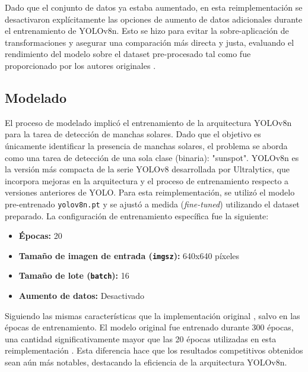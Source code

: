 \documentclass[journal]{IEEEtran}
\begin{document}
Dado que el conjunto de datos ya estaba aumentado, en esta reimplementación se desactivaron explícitamente las opciones de aumento de datos adicionales durante el entrenamiento de YOLOv8n. Esto se hizo para evitar la sobre-aplicación de transformaciones y asegurar una comparación más directa y justa, evaluando el rendimiento del modelo sobre el dataset pre-procesado tal como fue proporcionado por los autores originales \cite{Santos2023}.
\subsection{Modelado}
El proceso de modelado implicó el entrenamiento de la arquitectura YOLOv8n para la tarea de detección de manchas solares. Dado que el objetivo es únicamente identificar la presencia de manchas solares, el problema se aborda como una tarea de detección de una sola clase (binaria): "sunspot". YOLOv8n es la versión más compacta de la serie YOLOv8 desarrollada por Ultralytics, que incorpora mejoras en la arquitectura y el proceso de entrenamiento respecto a versiones anteriores de YOLO. Para esta reimplementación, se utilizó el modelo pre-entrenado \texttt{yolov8n.pt} y se ajustó a medida (\textit{fine-tuned}) utilizando el dataset preparado. La configuración de entrenamiento específica fue la siguiente:
\begin{itemize}
    \item \textbf{Épocas:} 20
    \item \textbf{Tamaño de imagen de entrada (\texttt{imgsz}):} 640x640 píxeles
    \item \textbf{Tamaño de lote (\texttt{batch}):} 16
    \item \textbf{Aumento de datos:} Desactivado
\end{itemize}

Siguiendo las mismas características que la implementación original \cite{Santos2023}, salvo en las épocas de entrenamiento. El modelo original fue entrenado durante 300 épocas, una cantidad significativamente mayor que las 20 épocas utilizadas en esta reimplementación \cite{Santos2023}. Esta diferencia hace que los resultados competitivos obtenidos sean aún más notables, destacando la eficiencia de la arquitectura YOLOv8n.
\end{document}
